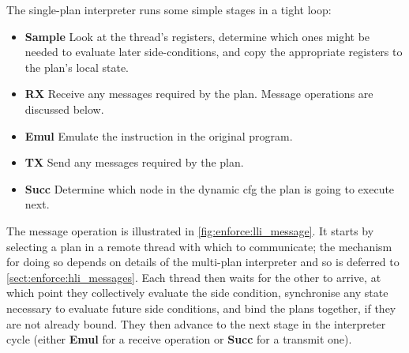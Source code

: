 The single-plan interpreter runs some simple stages in a tight loop:
\begin{itemize}
\item \textbf{Sample} Look at the thread's registers, determine which
  ones might be needed to evaluate later side-conditions, and copy the
  appropriate registers to the plan's local state.

\item \textbf{RX} Receive any messages required by the plan.  Message
  operations are discussed below.

\item \textbf{Emul} Emulate the instruction in the original program.

\item \textbf{TX} Send any messages required by the plan.

\item \textbf{Succ} Determine which node in the \gls{dynamic cfg} the
  plan is going to execute next.
\end{itemize}
The message operation is illustrated in
\autoref{fig:enforce:lli_message}.  It starts by selecting a plan in a
remote thread with which to communicate; the mechanism for doing so
depends on details of the multi-plan interpreter and so is deferred to
\autoref{sect:enforce:hli_messages}.  Each thread then waits for the
other to arrive, at which point they collectively evaluate the
\gls{side condition}, synchronise any state necessary to evaluate
future \glspl{side condition}, and bind the plans together, if they
are not already bound.  They then advance to the next stage in the
interpreter cycle (either \textbf{Emul} for a receive operation or
\textbf{Succ} for a transmit one).

